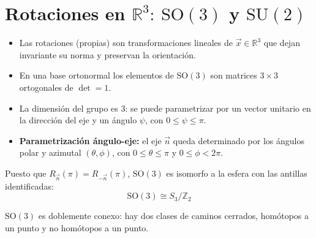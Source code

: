 \section{Rotaciones en $\mathbb{R}^3:\ \mathrm{SO}(3)$ y $\mathrm{SU}(2)$}
\newcommand{\normalv}{\vec{n}}
\newcommand{\posv}{\vec{x}}
\newcommand{\SU}{\mathrm{SU}(2)}
\newcommand{\SO}{\mathrm{SO}(3)}
\newcommand{\su}{\mathfrak{su}(2)}
\newcommand{\so}{\mathfrak{so}(3)}

\begin{itemize}
\item Las rotaciones (propias) son transformaciones lineales de $\vec{x}\in \mathbb{R}^3$ que dejan invariante su norma y preservan la orientación. 
\item En una base ortonormal los elementos de $\mathrm{SO}(3)$ son matrices $3\times 3$ ortogonales de $\det=1$.
\item La dimensión del grupo es 3: se puede parametrizar por un vector unitario en la dirección del eje y un ángulo $\psi$, con $0\leq\psi\leq  \pi$.
\item \textbf{Parametrización ángulo-eje:} el eje $\normalv$ queda determinado por los ángulos polar y azimutal $(\theta,\phi)$, con $0\leq \theta\leq \pi$ y $0\leq\phi < 2\pi$.
\end{itemize}



\begin{remark}
Puesto que $R_{\normalv}(\pi)=R_{-\normalv}(\pi)$, $\mathrm{SO}(3)$ es isomorfo a la esfera con las antillas identificadas:
\begin{equation}
\mathrm{SO(3)}\cong S_3/\mathbb{Z}_2
\end{equation}
\end{remark}



\begin{nota}
$\mathrm{SO}(3)$ es doblemente conexo: hay dos clases de caminos cerrados, homótopos a un punto y no homótopos a un punto.
\end{nota}


